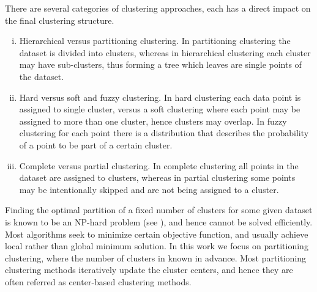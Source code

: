 There are several categories of clustering approaches, each has a direct impact on the final clustering structure.
\begin{enumerate}[(i)]
	\item Hierarchical versus partitioning clustering. In partitioning clustering the dataset is divided into clusters, whereas in hierarchical clustering each cluster may have sub-clusters, thus forming a tree which leaves are single points of the dataset.
	\item Hard versus soft and fuzzy clustering. In hard clustering each data point is assigned to single cluster, versus a soft clustering where each point may be assigned to more than one cluster, hence clusters may overlap. In fuzzy clustering for each point there is a distribution that describes the probability of a point to be part of a certain cluster.
	\item Complete versus partial clustering. In complete clustering all points in the dataset are assigned to clusters, whereas in partial clustering some points may be intentionally skipped and are not being assigned to a cluster.
\end{enumerate}

Finding the optimal partition of a fixed number of clusters for some given dataset is known to be an NP-hard problem (see \cite{GJ1979}), and hence cannot be solved efficiently. Most algorithms seek to minimize certain objective function, and usually achieve local rather than global minimum solution. In this work we focus on partitioning clustering, where the number of clusters in known in advance. Most partitioning clustering methods iteratively update the cluster centers, and hence they are often referred as center-based clustering methods. \medskip

